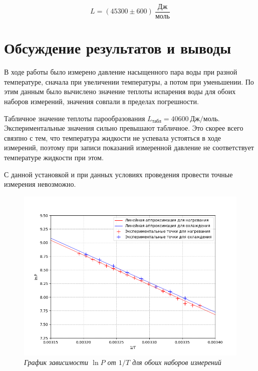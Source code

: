 \documentclass[a4paper,12pt]{article}
\begin{document}
\begin{equation}
    L = (45300 \pm 600) \ \frac{\text{Дж}}{\text{моль}}
\end{equation}

\section{Обсуждение результатов и выводы}

В ходе работы было измерено давление насыщенного пара воды при разной температуре, сначала при увеличении температуры, а потом при уменьшении. По этим данным было вычислено значение теплоты испарения воды для обоих наборов измерений, значения совпали в пределах погрешности.

Табличное значение теплоты парообразования $L_\text{табл} = 40600 \ \text{Дж}/\text{моль}$. Экспериментальные значения сильно превышают табличное. Это скорее всего связпно с тем, что температура жидкости не успевала устояться в ходе измерений, поэтому при записи показаний измеренной давление не соответствует температуре жидкости при этом.

С данной установкой и при данных условиях проведения провести точные измерения невозможно.


\newpage

\begin{figure}[h!]
        \centering
	\includegraphics[width=1.1\textwidth]{graph.png}
	\caption{\textit{График зависимости $\ln{P}$ от $1/T$ для обоих наборов измерений}}
	\label{graph}
\end{figure}
\end{document}
